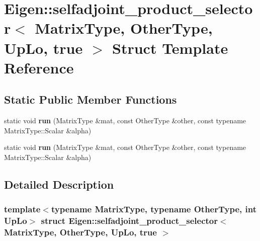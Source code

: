 \hypertarget{struct_eigen_1_1selfadjoint__product__selector_3_01_matrix_type_00_01_other_type_00_01_up_lo_00_01true_01_4}{}\section{Eigen\+:\+:selfadjoint\+\_\+product\+\_\+selector$<$ Matrix\+Type, Other\+Type, Up\+Lo, true $>$ Struct Template Reference}
\label{struct_eigen_1_1selfadjoint__product__selector_3_01_matrix_type_00_01_other_type_00_01_up_lo_00_01true_01_4}
\subsection*{Static Public Member Functions}
\begin{DoxyCompactItemize}
\item 
\mbox{\label{struct_eigen_1_1selfadjoint__product__selector_3_01_matrix_type_00_01_other_type_00_01_up_lo_00_01true_01_4_a7ed6fd3bf80ebbb7f2bd50c7e01bec1f}} 
static void {\bfseries run} (Matrix\+Type \&mat, const Other\+Type \&other, const typename Matrix\+Type\+::\+Scalar \&alpha)
\item 
\mbox{\label{struct_eigen_1_1selfadjoint__product__selector_3_01_matrix_type_00_01_other_type_00_01_up_lo_00_01true_01_4_a7ed6fd3bf80ebbb7f2bd50c7e01bec1f}} 
static void {\bfseries run} (Matrix\+Type \&mat, const Other\+Type \&other, const typename Matrix\+Type\+::\+Scalar \&alpha)
\end{DoxyCompactItemize}


\subsection{Detailed Description}
\subsubsection*{template$<$typename Matrix\+Type, typename Other\+Type, int Up\+Lo$>$\newline
struct Eigen\+::selfadjoint\+\_\+product\+\_\+selector$<$ Matrix\+Type, Other\+Type, Up\+Lo, true $>$}



